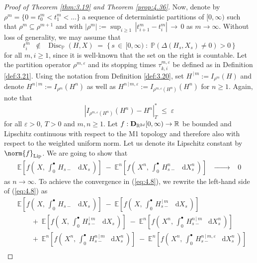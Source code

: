 \documentclass[11pt]{article}
\theoremstyle{definition}\newtheorem{example}[theorem]{Example}
\theoremstyle{definition}\newtheorem{counterexample}[theorem]{Counterexample}
\theoremstyle{definition}\newtheorem{remark}[theorem]{Remark}
\theoremstyle{definition}\newtheorem{defi}[theorem]{Definition}
\numberwithin{equation}{section}
\newcommand{\R}{\mathbb{R}}
\newcommand{\D}{{\bf D}}											%
\newcommand*\diff{\mathop{}\!\mathrm{d}}								%
\newcommand{\E}{\mathbb{E}}											%
\newcommand{\Pro}{\mathbb{P}}										%
\renewcommand{\|}{\; : \, \;}											%
\newcommand{\conv}[2]{\; \xrightarrow[ {#1}]{#2} \; }						%
\begin{document}
\begin{proof}[Proof of Theorem \ref{thm:3.19} and Theorem \ref{prop:4.36}]
	Now, denote by $\rho^m=\{0=t^m_0< t^m_1 < ...\}$ a sequence of deterministic partitions of $[0,\infty)$ such that $\rho^m \subseteq \rho^{m+1}$ and with $|\rho^m|:= \operatorname{sup}_{i\ge 1} \,  |t^m_{i+1}-t^m_i| \, \to \, 0$ as $m\to \infty$.  Without loss of generality, we may assume that 
	$$ t^m_i \; \; \notin \; \; \operatorname{Disc}_\Pro(H,X) \; = \; \{ \, s \, \in \, [0,\infty) \; : \; \Pro(\Delta (H_s,X_s) \neq 0) > 0\, \}$$
	for all $m,i\ge 1$, since it is well-known that the set on the right is countable. Let the partition operator $\rho^{m,\varepsilon}$ and its stopping times $\tau^{m,\varepsilon}_{k,i}$ be defined as in Definition \ref{def:3.21}. Using the notation from Definition \ref{def:3.20}, set $H^{\, \vert \, m} := I_{\rho^m}(H)$ and denote $H^{n\, \vert \,  m} := I_{\rho^m}(H^n)$ as well as $H^{n \, \vert \,  m,\varepsilon} := I_{\rho^{m,\varepsilon}(H^n)}(H^n)$ for $n\ge 1$. Again, note that 
	$$ |I_{\rho^{m,\varepsilon}(H^n)}(H^n) - H^n |^*_T  \; \le \; \varepsilon$$ for all $\varepsilon>0$, $T>0$ and $m,n\ge 1$. Let $f: \D_{\R^{2d}}[0,\infty) \to \R$ be bounded and Lipschitz continuous with respect to the M1 topology and therefore also with respect to the weighted uniform norm. Let us denote its Lipschitz constant by $\norm{f}_{\operatorname{Lip}}$. We are going to show that 
	\begin{align}
		\E\left[ f \left(\, X, \, \int_0^\bullet \, H_{s-} \; \diff X_s \, \right)\right] \; - \;\E^n\left[ f \left(\, X^n, \, \int_0^\bullet \, H^n_{s-} \; \diff X^n_s \, \right)\right] \; \; \conv{\phantom{n \to \infty}}{}\; \; 0 \label{eq:4.8}
	\end{align}
	as $n\to \infty$. To achieve the convergence in (\ref{eq:4.8}), we rewrite the left-hand side of (\ref{eq:4.8}) as 
	\begin{align*}
		&\E\left[ f \left(\, X, \,\int_0^\bullet \, H_{s-} \; \diff X_s \, \right)\right] \; - \; \E\left[ f \left(\, X, \, \int_0^\bullet \, H^{\, \vert \, m}_{s-} \; \diff X_s \, \right)\right] \label{eq:T1} \tag{T1}\\
		& \qquad + \; \E\left[ f \left(\, X, \, \int_0^\bullet \, H^{\, \vert \, m}_{s-} \; \diff X_s \,  \right)\right] \; - \; \E^n\left[ f \left(\, X^n, \,\int_0^\bullet \, H^{n \, \vert \, m}_{s-} \; \diff X^n_s \, \right)\right] \label{eq:T2} \tag{T2}\\
		& \qquad + \;\E^n\left[ f \left(\, X^n, \,\int_0^\bullet \, H^{n\, \vert \, m}_{s-} \; \diff X^n_s \, \right)\right] \; - \; \E^n\left[ f \left(\, X^n, \, \int_0^\bullet \, H^{n \, \vert \, m,\varepsilon}_{s-} \; \diff X^n_s \, \right)\right] \label{eq:T3}\tag{T3}\\

\end{align*}
\end{proof}
\end{document}
